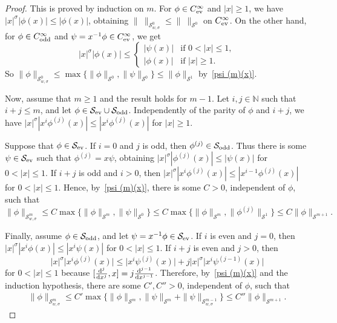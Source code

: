 \documentclass[11pt]{article}
\newcommand{\N}{\mathbb{N}}
\renewcommand{\SS}{\mathcal{S}}
\newcommand{\Cinf}{C^\infty}
\begin{document}
\begin{proof}
  This is proved by induction on $m$. For $\phi\in C^\infty_{\text{\rm ev}}$ and $|x|\ge1$, we have $|x|^\sigma |\phi(x)|\le|\phi(x)|$, obtaining $\|\ \|_{\SS_{w,\sigma}^0}\le\|\ \|_{\SS^0}$ on $\Cinf_{\text{\rm ev}}$. On the other hand, for $\phi\in\Cinf_{\text{\rm odd}}$ and $\psi=x^{-1}\phi\in\Cinf_{\text{\rm ev}}$, we get{\samepage
    \[
      |x|^\sigma|\phi(x)|\le
        \begin{cases}
          |\psi(x)| & \text{if $0<|x|\le1$},\\
          |\phi(x)| & \text{if $|x|\ge1$} .
        \end{cases}
    \]
  So $\|\phi\|_{\SS_{w,\sigma}^0}\le\max\{\|\phi\|_{\SS^0},\|\psi\|_{\SS^0}\}\le\|\phi\|_{\SS^1}$ by~\eqref{psi (m)(x)}.}

  Now, assume that $m\ge1$ and the result holds for $m-1$. Let $i,j\in\N$ such that $i+j\le m$, and let $\phi\in\SS_{\text{\rm ev}}\cup\SS_{\text{\rm odd}}$. Independently of the parity of $\phi$ and $i+j$, we have $|x|^\sigma |x^i\phi^{(j)}(x)|\le|x^i\phi^{(j)}(x)|$ for $|x|\ge1$.

  Suppose that $\phi\in\SS_{\text{\rm ev}}$. If $i=0$ and $j$ is odd, then $\phi^{(j)}\in\SS_{\text{\rm odd}}$. Thus there is some $\psi\in\SS_{\text{\rm ev}}$ such that $\phi^{(j)}=x\psi$, obtaining $|x|^\sigma|\phi^{(j)}(x)|\le|\psi(x)|$ for $0<|x|\le1$. If $i+j$ is odd and $i>0$, then $|x|^\sigma|x^i\phi^{(j)}(x)|\le|x^{i-1}\phi^{(j)}(x)|$ for $0<|x|\le1$. Hence, by~\eqref{psi (m)(x)}, there is some $C>0$, independent of $\phi$, such that
    \[
      \|\phi\|_{\SS_{w,\sigma}^m}\le C\max\{\|\phi\|_{\SS^m},\|\psi\|_{\SS^0}\}\le C\max\bigl\{\|\phi\|_{\SS^m},\|\phi^{(j)}\|_{\SS^1}\bigr\}\le C \|\phi\|_{\SS^{m+1}} .
    \]

  Finally, assume $\phi\in\SS_{\text{\rm odd}}$, and let $\psi=x^{-1}\phi\in\SS_{\text{\rm ev}}$. If $i$ is even and $j=0$, then $|x|^\sigma |x^i\phi(x)|\le|x^i\psi(x)|$ for $0<|x|\le1$. If $i+j$ is even and $j>0$, then
    \[
      |x|^\sigma\big|x^i\phi^{(j)}(x)\big|\le\big|x^i\psi^{(j)}(x)\big|+j |x|^\sigma\big|x^i\psi^{(j-1)}(x)\big|
    \]
  for $0<|x|\le1$ because $[\frac{{\rm d}^j}{{\rm d}x^j},x]=j \frac{{\rm d}^{j-1}}{{\rm d}x^{j-1}}$. Therefore, by~\eqref{psi (m)(x)} and the induction hypothesis, there are some $C',C''>0$, independent of $\phi$, such that
    \begin{gather*}
      \|\phi\|_{\SS_{w,\sigma}^m}\le C'\max\bigl\{\|\phi\|_{\SS^m},\|\psi\|_{\SS^m}+\|\psi\|_{\SS_{w,\sigma}^{m-1}}\bigr\}\le C'' \|\phi\|_{\SS^{m+1}} .
\tag*{\qed}
    \end{gather*}
\renewcommand{\qed}{}
\end{proof}
\end{document}
